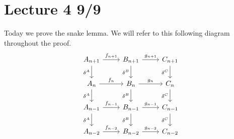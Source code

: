 \section{Lecture 4 9/9}
Today we prove the snake lemma. We will refer to this following diagram throughout the proof.
\[\begin{tikzcd}
	{A_{n+1}} & {B_{n+1}} & {C_{n+1}} \\
	{A_n} & {B_n} & {C_n} \\
	{A_{n-1}} & {B_{n-1}} & {C_{n-1}} \\
	{A_{n-2}} & {B_{n-2}} & {C_{n-2}}
	\arrow["{f_{n+1}}", from=1-1, to=1-2]
	\arrow["{\delta^A}"', from=1-1, to=2-1]
	\arrow["{g_{n+1}}", from=1-2, to=1-3]
	\arrow["{\delta^B}"', from=1-2, to=2-2]
	\arrow["{\delta^C}"', from=1-3, to=2-3]
	\arrow["{f_n}", from=2-1, to=2-2]
	\arrow["{\delta^A}"', from=2-1, to=3-1]
	\arrow["{g_n}", from=2-2, to=2-3]
	\arrow["{\delta^B}"', from=2-2, to=3-2]
	\arrow["{\delta^C}"', from=2-3, to=3-3]
	\arrow["{f_{n-1}}", from=3-1, to=3-2]
	\arrow["{\delta^A}"', from=3-1, to=4-1]
	\arrow["{g_{n-1}}", from=3-2, to=3-3]
	\arrow["{\delta^B}"', from=3-2, to=4-2]
	\arrow["{\delta^C}"', from=3-3, to=4-3]
	\arrow["{f_{n-2}}", from=4-1, to=4-2]
	\arrow["{g_{n-2}}", from=4-2, to=4-3]
\end{tikzcd}\]
